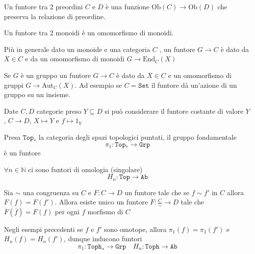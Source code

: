 \begin{example}{}
    Un funtore tra 2 preordini \(C\) e \(D\) è una funzione \(\mathrm{Ob}{(C)} \to \mathrm{Ob}{(D)}\)  che preserva la relazione di preordine.
\end{example}

\begin{example}{}
    Un funtore tra 2 monoidi è un omomorfismo di monoidi.

    Più in generale dato un monoide e una categoria \(C\) , un funtore \(G \to C\) è dato da \(X \in C\) e da un omomorfismo di monoidi \(G \to \mathrm{End}_C{(X)}\) 

    Se \(G\) è un gruppo un funtore \(G \to C\) è dato da \(X \in C\) e un
    omomorfismo di gruppi \(G \to \mathrm{Aut}_C{(X)}\). Ad esempio se \(C = \mathtt{Set}\) il funtore dà un'azione di un gruppo su un insieme.
\end{example}

\begin{example}
    Date \(C, D\) categorie preso \(Y \subseteq D \) si può considerare il
    funtore costante di valore \(Y\), \(C \to D\), \(X \mapsto Y\) e \(f \mapsto 1_Y\) 
\end{example}

\begin{example}{}
    Presa \(\mathtt{Top}_*\) la categoria degli spazi topologici puntati, il
    gruppo fondamentale 
    \[
        \pi_{1} : \mathtt{Top}_* \to \mathtt{Grp}
    \]
    è un funtore
\end{example}

\begin{example}{}
    \(\forall n \in \mathbb{N}\) ci sono funtori di omologia (singolare)
    \[
      H_{n} : \mathtt{Top} \to \mathtt{Ab}
    \]
\end{example}
\begin{eser}{}
    Sia \(\sim \) una congruenza su \(C\) e \(F : C \to D\) un funtore tale che
    se \(f \sim f'\) in \(C\) allora \(F{(f)} = F{(f')}\).
    Allora esiste unico un funtore \(\overline{F} : \frac{C}{\sim} \to D\) tale
    che \(\overline{F}{(\overline{f})} = F{(f)}\) per ogni \(f\) morfismo di \(C\) 
\end{eser}
\begin{example}{}
    Negli esempi precedenti se \(f\) e \(f'\) sono omotope, allora \(\pi_{1}{(f)} = \pi_{1}{(f')}\) e \(H_{n}{(f)} = H_{n}{(f')}\), dunque inducono funtori
    \[
      \pi_{1} : \mathtt{Toph}_* \to \mathtt{Grp} \quad H_{n} : \mathtt{Toph} \to \mathtt{Ab}
    \]
\end{example}

